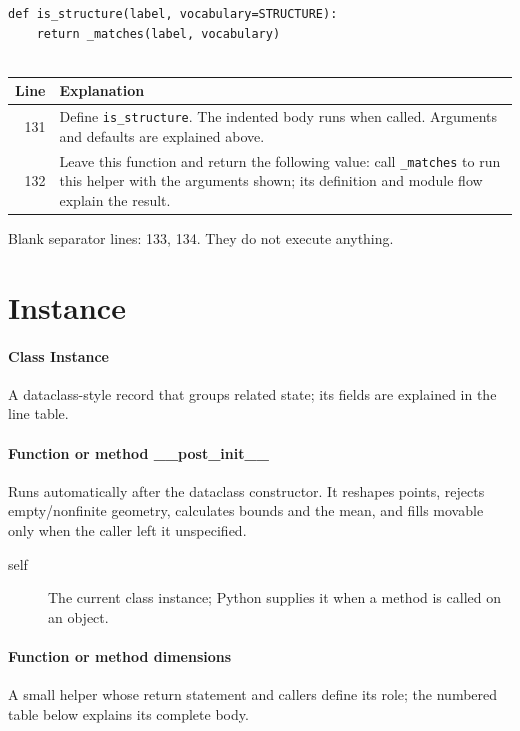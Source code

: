 \documentclass[11pt,a4paper]{book}
\begin{document}
\begin{lstlisting}[firstnumber=131]
def is_structure(label, vocabulary=STRUCTURE):
    return _matches(label, vocabulary)


\end{lstlisting}

\begin{longtable}{r p{}}

\textbf{Line} & \textbf{Explanation} \\ \hline \endhead

131 & Define \texttt{is\_structure}. The indented body runs when called. Arguments and defaults are explained above. \\

132 & Leave this function and return the following value: call \texttt{\_matches} to run this helper with the arguments shown; its definition and module flow explain the result. \\

\end{longtable}

Blank separator lines: 133, 134. They do not execute anything.

\section{Instance}

\paragraph{Class Instance}
A dataclass-style record that groups related state; its fields are explained in the line table.


\paragraph{Function or method \_\_post\_init\_\_}
Runs automatically after the dataclass constructor. It reshapes points, rejects empty/nonfinite geometry, calculates bounds and the mean, and fills movable only when the caller left it unspecified.

\begin{description}
\item[self] The current class instance; Python supplies it when a method is called on an object.
\end{description}

\paragraph{Function or method dimensions}
A small helper whose return statement and callers define its role; the numbered table below explains its complete body.
\end{document}
